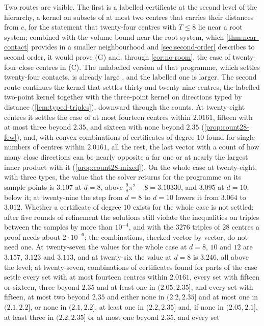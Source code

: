 \documentclass[11pt,reqno]{amsart}
\renewcommand{\_}{\origunderscore\allowbreak}
\numberwithin{equation}{section}
\theoremstyle{plain}
\theoremstyle{definition}
\theoremstyle{remark}
\begin{document}
Two routes are visible. The first is a labelled certificate at the second
level of the hierarchy, a kernel on subsets of at most two centres that
carries their distances from $c$, for the statement that twenty-four centres
with $T\le8$ lie near a root system; combined with the volume bound near
the root system, which \cref{thm:near-contact} provides in a smaller
neighbourhood and \cref{sec:second-order} describes to second order, it
would prove (G) and, through \cref{cor:no-room}, the case of twenty-four
close centres in (C). The unlabelled version of that programme, which
settles twenty-four contacts, is already large \cite{LLM24}, and the
labelled one is larger. The second route continues the kernel that
settles thirty and twenty-nine centres, the labelled two-point kernel
together with the three-point kernel on directions typed by distance
(\cref{lem:typed-triples}), downward through the counts. At twenty-eight
centres it settles the case of at most fourteen centres within $2.0161$,
fifteen with at most three beyond $2.35$, and sixteen with none beyond $2.35$
(\cref{prop:count28-few}), and, with convex combinations of certificates of
degree $10$ found for single numbers of centres within $2.0161$, all the
rest, the last vector with a count of how many close directions can be
nearly opposite a far one or at nearly the largest inner product with it
(\cref{prop:count28-mixed}). On the whole case at twenty-eight, with three
types, the value that the solver returns for the programme on its sample
points is $3.107$ at $d=8$, above $\frac98\pi^2-8=3.10330$, and $3.095$ at
$d=10$, below it; at twenty-nine the step from $d=8$ to $d=10$ lowers it from
$3.064$ to $3.012$. Whether a certificate of degree $10$ exists for the whole case is
not settled: after five rounds of refinement the solutions still violate the
inequalities on triples between the samples by more than $10^{-4}$, and with
the $3276$ triples of $28$ centres a proof needs about $2\cdot10^{-6}$; the
combinations, checked vector by vector, do not need one. At
twenty-seven the values for the whole case at $d=8$, $10$ and $12$ are
$3.157$, $3.123$ and $3.113$, and at twenty-six the value at $d=8$ is
$3.246$, all above the level; at twenty-seven, combinations of certificates
found for parts of the case settle every set with at most fourteen centres within
$2.0161$, every set with fifteen or sixteen, three beyond $2.35$ and at
least one in $(2.05,2.35]$, and every set with fifteen, at most two beyond
$2.35$ and either none in $(2.2,2.35]$ and at most one in $(2.1,2.2]$, or none in $(2.1,2.2]$, at least one in $(2.2,2.35]$ and, if none in $(2.05,2.1]$, at least three in $(2.2,2.35]$ or at most one beyond $2.35$, and every set
\end{document}
